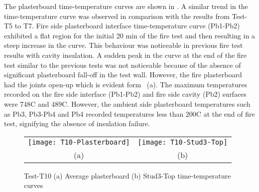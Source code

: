 The plasterboard time-temperature curves are shown in . A similar trend in the time-temperature curve was observed in comparison with the results from Test-T5 to T7. Fire side plasterboard interface time-temperature curve (Pb1-Pb2) exhibited a flat region for the initial 20 min of the fire test and then resulting in a steep increase in the curve. This behaviour was noticeable in previous fire test results with cavity insulation. A sudden peak in the curve at the end of the fire test similar to the previous tests was not noticeable because of the absence of significant plasterboard fall-off in the test wall. However, the fire plasterboard had the joints open-up which is evident form ~(a). The maximum temperatures recorded on the fire side interface (Pb1-Pb2) and fire side cavity (Pb2) surfaces were 748\degree C and 489\degree C. However, the ambient side plasterboard temperatures such as Pb3, Pb3-Pb4 and Pb4 recorded temperatures less than 200\degree C at the end of fire test, signifying the absence of insulation failure.
\begin{figure}[!htbp]
	\centering
		\begin{tabular}{cc}
			\texttt{[image: T10-Plasterboard]} & \texttt{[image: T10-Stud3-Top]} \\ 
			(a) & (b) \\ 
		\end{tabular} 
		\caption{Test-T10 (a) Average plasterboard (b) Stud3-Top time-temperature curves}
		\label{fig:T10-time-temperature}
\end{figure}

